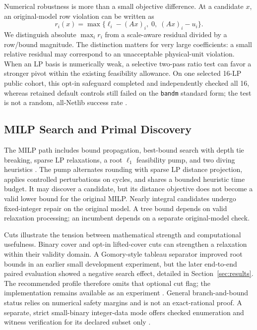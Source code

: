\documentclass[10pt,a4paper,twocolumn]{article}
\begin{document}
Numerical robustness is more than a small objective difference. At a candidate $x$, an original-model row violation can be written as
\begin{equation}
 r_i(x)=\max\{\ell_i-(Ax)_i,\;0,\;(Ax)_i-u_i\}.
\end{equation}
We distinguish absolute $\max_i r_i$ from a scale-aware residual divided by a row/bound magnitude. The distinction matters for very large coefficients: a small relative residual may correspond to an unacceptable physical-unit violation. When an LP basis is numerically weak, a selective two-pass ratio test can favor a stronger pivot within the existing feasibility allowance. On one selected 16-LP public cohort, this opt-in safeguard completed and independently checked all 16, whereas retained default controls still failed on the \texttt{bandm} standard form; the test is not a random, all-Netlib success rate \cite{lpstable}.

\subsection{MILP Search and Primal Discovery}

The MILP path includes bound propagation, best-bound search with depth tie breaking, sparse LP relaxations, a root $\ell_1$ feasibility pump, and two diving heuristics \cite{arch}. The pump alternates rounding with sparse LP distance projection, applies controlled perturbations on cycles, and shares a bounded heuristic time budget. It may discover a candidate, but its distance objective does not become a valid lower bound for the original MILP. Nearly integral candidates undergo fixed-integer repair on the original model. A tree bound depends on valid relaxation processing; an incumbent depends on a separate original-model check.

Cuts illustrate the tension between mathematical strength and computational usefulness. Binary cover and opt-in lifted-cover cuts can strengthen a relaxation within their validity domain. A Gomory-style tableau separator improved root bounds in an earlier small development experiment, but the later end-to-end paired evaluation showed a negative search effect, detailed in Section~\ref{sec:results}. The recommended profile therefore omits that optional cut flag; the implementation remains available as an experiment \cite{iter37}. General branch-and-bound status relies on numerical safety margins and is not an exact-rational proof. A separate, strict small-binary integer-data mode offers checked enumeration and witness verification for its declared subset only \cite{arch}.
\end{document}
